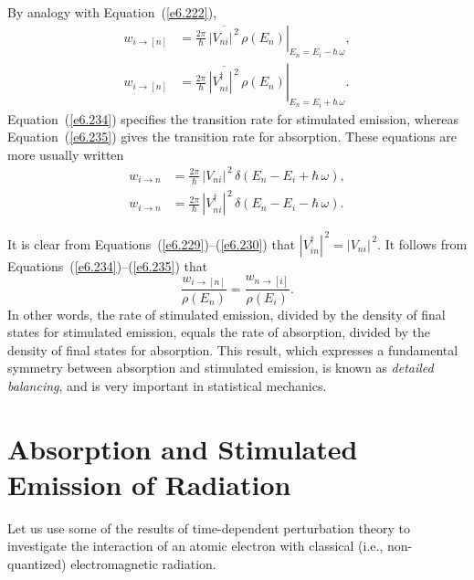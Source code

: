 By analogy with Equation~(\ref{e6.222}),
\begin{align}\label{e6.234}
w_{i\rightarrow [n]} &=\left. \frac{2\pi}{\hbar} \,\overline{|V_{ni}|^{\,2}}\,\rho(E_n)
\right|_{E_n = E_i-\hbar\,\omega},\\[0.5ex]
w_{i\rightarrow [n]} &=\left.  \frac{2\pi}{\hbar} \,\overline{
|V_{ni}^\dagger|^{\,2}}\,\rho(E_n)\right|_{E_n = E_i+\hbar\,\omega}.\label{e6.235}
\end{align}
Equation~(\ref{e6.234}) specifies the transition rate for stimulated emission, whereas
Equation~(\ref{e6.235}) gives the transition rate for absorption. 
These equations are more usually written
\begin{align}\label{e6.236a}
w_{i\rightarrow n} &= \frac{2\pi}{\hbar} \,|V_{ni}|^{\,2}
\, \delta(E_n-E_i+\hbar\,\omega),\\[0.5ex]
w_{i\rightarrow n} &=  \frac{2\pi}{\hbar} \,
|V_{ni}^\dagger|^{\,2}\,\delta(E_n -E_i-\hbar\,\omega).\label{e6.237}
\end{align}

It is clear from Equations~(\ref{e6.229})--(\ref{e6.230}) that $|V_{in}^\dagger|^{\,2} = |V_{ni}|^{\,2}$.
It follows from Equations~(\ref{e6.234})--(\ref{e6.235}) that
\begin{equation}
\frac{w_{i\rightarrow [n]}}{\rho(E_n)} = \frac{w_{n\rightarrow [i]}}{\rho(E_i)}.
\end{equation}
In other words, the rate of stimulated emission, divided by the density
of final states for stimulated emission, equals the rate of absorption,
 divided
by the density of final states for absorption. This result, which
expresses a fundamental symmetry between absorption and stimulated
emission, is known as {\em detailed balancing}, and is very important in
statistical mechanics. 

\section{Absorption and Stimulated Emission of Radiation}
Let us use some of the results of time-dependent perturbation theory
to investigate the interaction of an atomic electron with 
classical ({\rm i.e.}, non-quantized) electromagnetic radiation. 

